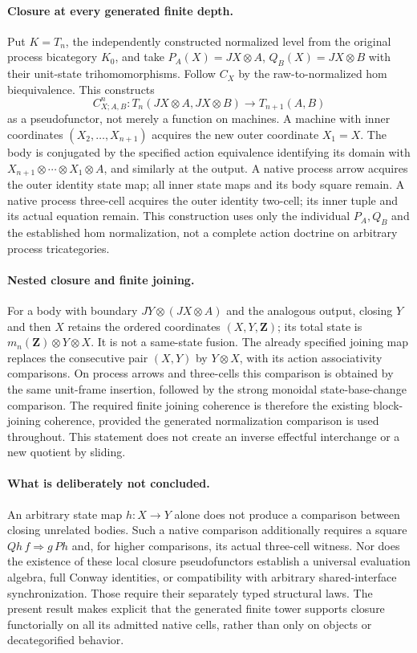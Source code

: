 \documentclass{article}
\begin{document}
\paragraph{Closure at every generated finite depth.} Put $K=T_n$, the independently constructed normalized level from the original process bicategory $K_0$, and take $P_A(X)=JX\otimes A$, $Q_B(X)=JX\otimes B$ with their unit-state trihomomorphisms. Follow $C_X$ by the raw-to-normalized hom biequivalence. This constructs
\[
 C^n_{X;A,B}:T_n(JX\otimes A,JX\otimes B)
 \longrightarrow T_{n+1}(A,B)
\]
as a pseudofunctor, not merely a function on machines. A machine with inner coordinates $(X_2,\ldots,X_{n+1})$ acquires the new outer coordinate $X_1=X$. The body is conjugated by the specified action equivalence identifying its domain with
$X_{n+1}\otimes\cdots\otimes X_1\otimes A$, and similarly at the output. A native process arrow acquires the outer identity state map; all inner state maps and its body square remain. A native process three-cell acquires the outer identity two-cell; its inner tuple and its actual equation remain. This construction uses only the individual $P_A,Q_B$ and the established hom normalization, not a complete action doctrine on arbitrary process tricategories.

\paragraph{Nested closure and finite joining.} For a body with boundary $JY\otimes(JX\otimes A)$ and the analogous output, closing $Y$ and then $X$ retains the ordered coordinates $(X,Y,\mathbf Z)$; its total state is $m_n(\mathbf Z)\otimes Y\otimes X$. It is not a same-state fusion. The already specified joining map replaces the consecutive pair $(X,Y)$ by $Y\otimes X$, with its action associativity comparisons. On process arrows and three-cells this comparison is obtained by the same unit-frame insertion, followed by the strong monoidal state-base-change comparison. The required finite joining coherence is therefore the existing block-joining coherence, provided the generated normalization comparison is used throughout. This statement does not create an inverse effectful interchange or a new quotient by sliding.

\paragraph{What is deliberately not concluded.} An arbitrary state map $h:X\to Y$ alone does not produce a comparison between closing unrelated bodies. Such a native comparison additionally requires a square $Qh\,f\Rightarrow g\,Ph$ and, for higher comparisons, its actual three-cell witness. Nor does the existence of these local closure pseudofunctors establish a universal evaluation algebra, full Conway identities, or compatibility with arbitrary shared-interface synchronization. Those require their separately typed structural laws. The present result makes explicit that the generated finite tower supports closure functorially on all its admitted native cells, rather than only on objects or decategorified behavior.
\end{document}
